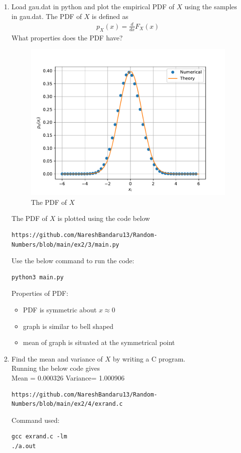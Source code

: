 \documentclass[journal,12pt,twocolumn]{IEEEtran}
\renewcommand\thesection{\arabic{section}}
\begin{document}
\begin{enumerate}[label=\thesection.\arabic*,ref=\thesection.\theenumi]
\item
Load gau.dat in python and plot the empirical PDF of $X$ using the samples in gau.dat. The PDF of $X$ is defined as
\begin{align}
p_{X}(x) = \frac{d}{dx}F_{X}(x)
\end{align}
What properties does the PDF have?
\\
\begin{figure}[H]
\centering
\includegraphics[width=\columnwidth]{gauss_pdf.pdf}
\caption{The PDF of $X$}
\label{fig:gauss_pdf}
\end{figure}

\solution The PDF of $X$ is plotted  using the code below
\begin{lstlisting}
https://github.com/NareshBandaru13/Random-Numbers/blob/main/ex2/3/main.py
\end{lstlisting}
Use the below command to run the code:
\begin{lstlisting}
python3 main.py
\end{lstlisting}
Properties of PDF:
\begin{itemize}
\item PDF is symmetric about $x \approx 0$\\
\item graph is similar to bell shaped\\
\item mean of graph is situated at the symmetrical point\\
\end{itemize}

\item Find the mean and variance of $X$ by writing a C program.\\
\solution
Running the below code gives \\
Mean = 0.000326
Variance= 1.000906
 \begin{lstlisting}
https://github.com/NareshBandaru13/Random-Numbers/blob/main/ex2/4/exrand.c
\end{lstlisting}
Command used:
\begin{lstlisting}
gcc exrand.c -lm
./a.out
\end{lstlisting}


\end{enumerate}
\end{document}
